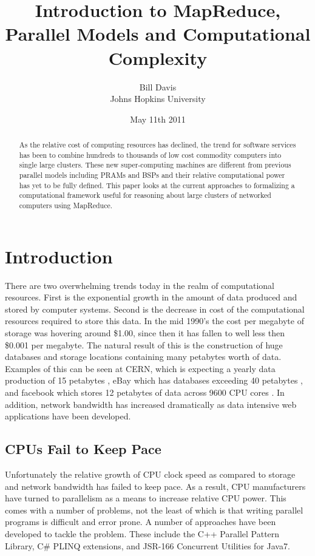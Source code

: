 \documentclass{article}
\title{Introduction to MapReduce, Parallel Models and Computational Complexity}
\author{Bill Davis\\Johns Hopkins University}
\date{May 11th 2011}
\begin{document}
\maketitle

\begin{abstract}
As the relative cost of computing resources has declined, the trend for software services has been to combine hundreds to thousands of low cost commodity computers into single large clusters. These new super-computing machines are different from previous parallel models including PRAMs and BSPs and their relative computational power has yet to be fully defined. This paper looks at the current approaches to formalizing a computational framework useful for reasoning about large clusters of networked computers using MapReduce. 
\end{abstract}

\tableofcontents

\pagebreak

\section{Introduction}
There are two overwhelming trends today in the realm of computational resources. First is the exponential growth in the amount of data produced and stored by computer systems. Second is the decrease in cost of the computational resources required to store this data. In the mid 1990's the cost per megabyte of storage was hovering around \$1.00, since then it has fallen to well less then \$0.001 per megabyte. The natural result of this is the construction of huge databases and storage locations containing many petabytes worth of data. Examples of this can be seen at CERN, which is expecting a yearly data production of 15 petabytes \cite{cern}, eBay which has databases exceeding 40 petabytes \cite{dbms2}, and facebook which stores 12 petabytes of data across 9600 CPU cores \cite{facebook}. In addition, network bandwidth has increased dramatically as data intensive web applications have been developed.

\subsection{CPUs Fail to Keep Pace}
Unfortunately the relative growth of CPU clock speed as compared to storage and network bandwidth has failed to keep pace. As a result, CPU manufacturers have turned to parallelism as a means to increase relative CPU power. This comes with a number of problems, not the least of which is that writing parallel programs is difficult and error prone. A number of approaches have been developed to tackle the problem. These include the C++ Parallel Pattern Library, C\# PLINQ extensions, and JSR-166 Concurrent Utilities for Java7. 
\end{document}
